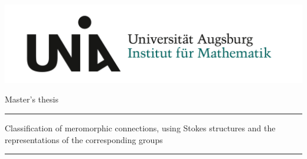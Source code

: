 
\begin{titlepage}
  \thispagestyle{empty}
  \includegraphics[width=\textwidth]{logo/Uni_Aug_Logo_IFM_RGB-crop.png}
  \newcommand{\Rule}{%
    \textcolor{myheadLineColor}{\rule{\textwidth}{0.5mm}}%
  }
  \begin{center}\sffamily
    \normalfont\sffamily\large
    Master's thesis
    \Rule
    \vspace{5mm}
    \textcolor{myheadLineColor}{
      \Huge{Classification of meromorphic connections, using Stokes structures
      and the representations of the corresponding groups}
    }
    \vspace{1mm}
    \Rule
  \end{center}
  \begin{center}
    \\ \vspace{1cm}
    \\
    \\ \vspace{1cm}
    \\
    \\ \vspace{1cm}
    \makebox[.5\textwidth][l]{\normalfont\sffamily\Large \today}
  \end{center}
  \vfill
  \vfill
\end{titlepage}

